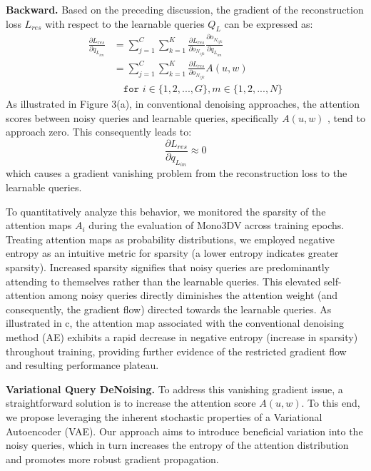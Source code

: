 \textbf{Backward.} Based on the preceding discussion, the gradient of the reconstruction loss $L_{res}$ with respect to the learnable queries $Q_L$ can be expressed as:
\begin{equation}
    \begin{aligned}
        \frac{\partial L_{res}}{\partial q_{L_{im}}} &= \sum_{j=1}^C\sum_{k=1}^K\frac{\partial L_{res}}{\partial o_{N_{ijk}}} \frac{\partial o_{N_{ijk}}}{\partial q_{L_{im}}} \\
        &= \sum_{j=1}^C\sum_{k=1}^K\frac{\partial L_{res}}{\partial o_{N_{ijk}}} A\left(u,w\right) \\
        & \hspace{1em} \texttt{for } i\in \{1,2,...,G\}, m\in \{1,2,...,N\}
    \end{aligned}
    \label{eq:backward_msa}
\end{equation}
As illustrated in Figure 3(a), in conventional denoising approaches, the attention scores between noisy queries and learnable queries, specifically $A\left(u,w\right)$ , tend to approach zero. This consequently leads to:
\begin{equation}
    \frac{\partial L_{res}}{\partial q_{L_{im}}}\approx 0
\end{equation}
which causes a gradient vanishing problem from the reconstruction loss to the learnable queries.

To quantitatively analyze this behavior, we monitored the sparsity of the attention maps \(A_i\) during the evaluation of Mono3DV across training epochs. Treating attention maps as probability distributions, we employed negative entropy as an intuitive metric for sparsity (a lower entropy indicates greater sparsity). Increased sparsity signifies that noisy queries are predominantly attending to themselves rather than the learnable queries. This elevated self-attention among noisy queries directly diminishes the attention weight (and consequently, the gradient flow) directed towards the learnable queries. As illustrated in c, the attention map associated with the conventional denoising method (AE) exhibits a rapid decrease in negative entropy (increase in sparsity) throughout training, providing further evidence of the restricted gradient flow and resulting performance plateau.

\noindent\textbf{Variational Query DeNoising.} To address this vanishing gradient issue, a straightforward solution is to increase the attention score $A\left(u,w\right)$. To this end, we propose leveraging the inherent stochastic properties of a Variational Autoencoder (VAE). Our approach aims to introduce beneficial variation into the noisy queries, which in turn increases the entropy of the attention distribution and promotes more robust gradient propagation.

